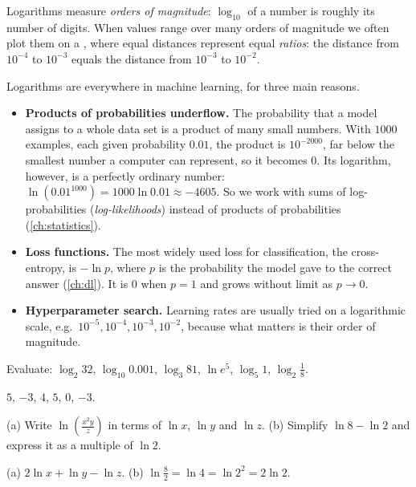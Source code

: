 Logarithms measure \emph{orders of magnitude}: $\log_{10}$ of a number is
roughly its number of digits. When values range over many orders of magnitude
we often plot them on a , where equal distances
represent equal \emph{ratios}: the distance from $10^{-4}$ to $10^{-3}$ equals
the distance from $10^{-3}$ to $10^{-2}$.

\begin{mlnote}
Logarithms are everywhere in machine learning, for three main reasons.
\begin{itemize}
  \item \textbf{Products of probabilities underflow.} The probability that a
    model assigns to a whole data set is a product of many small numbers. With
    $1000$ examples, each given probability $0.01$, the product is
    $10^{-2000}$, far below the smallest number a computer can represent, so
    it becomes $0$. Its logarithm, however, is a perfectly ordinary number:
    $\ln\left(0.01^{1000}\right) = 1000 \ln 0.01 \approx -4605$. So we work
    with sums of log-probabilities (\emph{log-likelihoods}) instead of
    products of probabilities (\cref{ch:statistics}).
  \item \textbf{Loss functions.} The most widely used loss for classification,
    the cross-entropy, is $-\ln p$, where $p$ is the probability the model gave
    to the correct answer (\cref{ch:dl}). It is $0$ when $p = 1$ and grows
    without limit as $p \to 0$.
  \item \textbf{Hyperparameter search.} Learning rates are usually tried on a
    logarithmic scale, e.g.\ $10^{-5}, 10^{-4}, 10^{-3}, 10^{-2}$, because what
    matters is their order of magnitude.
\end{itemize}
\end{mlnote}

\sectionexercises

\begin{exercise}
Evaluate: $\log_2 32$, $\log_{10} 0.001$, $\log_3 81$, $\ln e^5$, $\log_5 1$,
$\log_2 \tfrac18$.
\end{exercise}
\begin{solution}
$5$, $-3$, $4$, $5$, $0$, $-3$.
\end{solution}

\begin{exercise}
(a) Write $\ln\left(\tfrac{x^2 y}{z}\right)$ in terms of $\ln x$, $\ln y$ and
$\ln z$. (b) Simplify $\ln 8 - \ln 2$ and express it as a multiple of $\ln 2$.
\end{exercise}
\begin{solution}
(a) $2\ln x + \ln y - \ln z$. (b) $\ln\tfrac82 = \ln 4 = \ln 2^2 = 2\ln 2$.
\end{solution}

